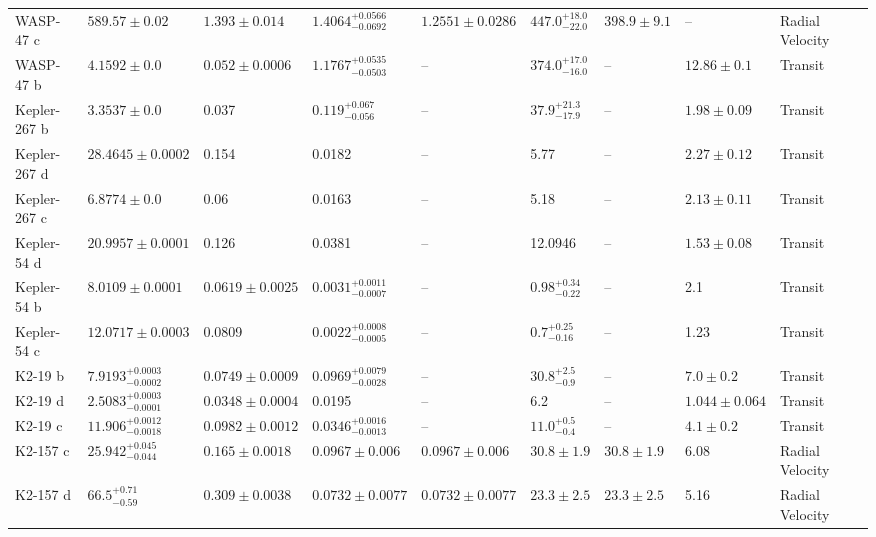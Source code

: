 \begin{tabular}{llllllllll}
WASP-47 c & $589.57 \pm 0.02$ & $1.393 \pm 0.014$ & $1.4064^{+0.0566}_{-0.0692}$ & $1.2551 \pm 0.0286$ & $447.0^{+18.0}_{-22.0}$ & $398.9 \pm 9.1$ & -- & Radial Velocity & \cite{NASCIMBENI_ET_AL__2023} \\
WASP-47 b & $4.1592 \pm 0.0$ & $0.052 \pm 0.0006$ & $1.1767^{+0.0535}_{-0.0503}$ & -- & $374.0^{+17.0}_{-16.0}$ & -- & $12.86 \pm 0.1$ & Transit & \cite{NASCIMBENI_ET_AL__2023} \\
Kepler-267 b & $3.3537 \pm 0.0$ & 0.037 & $0.119^{+0.067}_{-0.056}$ & -- & $37.9^{+21.3}_{-17.9}$ & -- & $1.98 \pm 0.09$ & Transit & \cite{ROWE_ET_AL__2014} \\
Kepler-267 d & $28.4645 \pm 0.0002$ & 0.154 & 0.0182 & -- & 5.77 & -- & $2.27 \pm 0.12$ & Transit & \cite{ROWE_ET_AL__2014} \\
Kepler-267 c & $6.8774 \pm 0.0$ & 0.06 & 0.0163 & -- & 5.18 & -- & $2.13 \pm 0.11$ & Transit & \cite{ROWE_ET_AL__2014} \\
Kepler-54 d & $20.9957 \pm 0.0001$ & 0.126 & 0.0381 & -- & 12.0946 & -- & $1.53 \pm 0.08$ & Transit & \cite{ROWE_ET_AL__2014} \\
Kepler-54 b & $8.0109 \pm 0.0001$ & $0.0619 \pm 0.0025$ & $0.0031^{+0.0011}_{-0.0007}$ & -- & $0.98^{+0.34}_{-0.22}$ & -- & 2.1 & Transit & \cite{STEFFEN_ET_AL__2013} \\
Kepler-54 c & $12.0717 \pm 0.0003$ & 0.0809 & $0.0022^{+0.0008}_{-0.0005}$ & -- & $0.7^{+0.25}_{-0.16}$ & -- & 1.23 & Transit & \cite{STEFFEN_ET_AL__2013} \\
K2-19 b & $7.9193^{+0.0003}_{-0.0002}$ & $0.0749 \pm 0.0009$ & $0.0969^{+0.0079}_{-0.0028}$ & -- & $30.8^{+2.5}_{-0.9}$ & -- & $7.0 \pm 0.2$ & Transit & \cite{ENTRICAN_ET_AL_2026} \\
K2-19 d & $2.5083^{+0.0003}_{-0.0001}$ & $0.0348 \pm 0.0004$ & 0.0195 & -- & 6.2 & -- & $1.044 \pm 0.064$ & Transit & \cite{ALMENARA_ET_AL_2025} \\
K2-19 c & $11.906^{+0.0012}_{-0.0018}$ & $0.0982 \pm 0.0012$ & $0.0346^{+0.0016}_{-0.0013}$ & -- & $11.0^{+0.5}_{-0.4}$ & -- & $4.1 \pm 0.2$ & Transit & \cite{ENTRICAN_ET_AL_2026} \\
K2-157 c & $25.942^{+0.045}_{-0.044}$ & $0.165 \pm 0.0018$ & $0.0967 \pm 0.006$ & $0.0967 \pm 0.006$ & $30.8 \pm 1.9$ & $30.8 \pm 1.9$ & 6.08 & Radial Velocity & \cite{CASTRO_GONZALEZ_ET_AL_2025} \\
K2-157 d & $66.5^{+0.71}_{-0.59}$ & $0.309 \pm 0.0038$ & $0.0732 \pm 0.0077$ & $0.0732 \pm 0.0077$ & $23.3 \pm 2.5$ & $23.3 \pm 2.5$ & 5.16 & Radial Velocity & \cite{CASTRO_GONZALEZ_ET_AL_2025} \\

\end{tabular}
